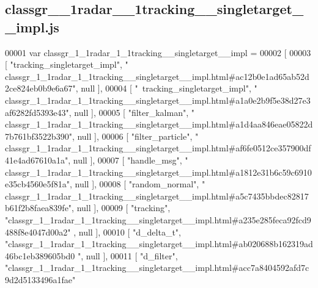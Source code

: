 \subsection{classgr\+\_\+\_\+1radar\+\_\+\_\+1tracking\+\_\+\+\_\+singletarget\+\_\+\+\_\+impl.\+js}
\label{classgr__1__1radar__1__1tracking____singletarget____impl_8js_source}

\begin{DoxyCode}
00001 var classgr_1_1radar_1_1tracking__singletarget__impl =
00002 [
00003     [ \textcolor{stringliteral}{"tracking\_singletarget\_impl"}, \textcolor{stringliteral}{"
      classgr\_1\_1radar\_1\_1tracking\_\_singletarget\_\_impl.html#ac12b0e1ad65ab52d2ce824eb0b9e6a67"}, null ],
00004     [ \textcolor{stringliteral}{"~tracking\_singletarget\_impl"}, \textcolor{stringliteral}{"
      classgr\_1\_1radar\_1\_1tracking\_\_singletarget\_\_impl.html#a1a0e2b9f5e38d27e3af6282fd5393e43"}, null ],
00005     [ \textcolor{stringliteral}{"filter\_kalman"}, \textcolor{stringliteral}{"
      classgr\_1\_1radar\_1\_1tracking\_\_singletarget\_\_impl.html#a1d4aa846eae05822d7b761bf3522b390"}, null ],
00006     [ \textcolor{stringliteral}{"filter\_particle"}, \textcolor{stringliteral}{"
      classgr\_1\_1radar\_1\_1tracking\_\_singletarget\_\_impl.html#af6fe0512ce357900df41e4ad67610a1a"}, null ],
00007     [ \textcolor{stringliteral}{"handle\_msg"}, \textcolor{stringliteral}{"
      classgr\_1\_1radar\_1\_1tracking\_\_singletarget\_\_impl.html#a1812e31b6c59c6910e35cb4560e5f81a"}, null ],
00008     [ \textcolor{stringliteral}{"random\_normal"}, \textcolor{stringliteral}{"
      classgr\_1\_1radar\_1\_1tracking\_\_singletarget\_\_impl.html#a5c7435bbdec82817b61f2b8faea839fe"}, null ],
00009     [ \textcolor{stringliteral}{"tracking"}, \textcolor{stringliteral}{"classgr\_1\_1radar\_1\_1tracking\_\_singletarget\_\_impl.html#a235e285feca92fcd9488f8e4047d00a2"}
      , null ],
00010     [ \textcolor{stringliteral}{"d\_delta\_t"}, \textcolor{stringliteral}{"classgr\_1\_1radar\_1\_1tracking\_\_singletarget\_\_impl.html#ab020688b162319ad46bc1eb389605bd0
      "}, null ],
00011     [ \textcolor{stringliteral}{"d\_filter"}, \textcolor{stringliteral}{"classgr\_1\_1radar\_1\_1tracking\_\_singletarget\_\_impl.html#acc7a8404592afd7c9d2d5133496a1fae"}

\end{DoxyCode}

